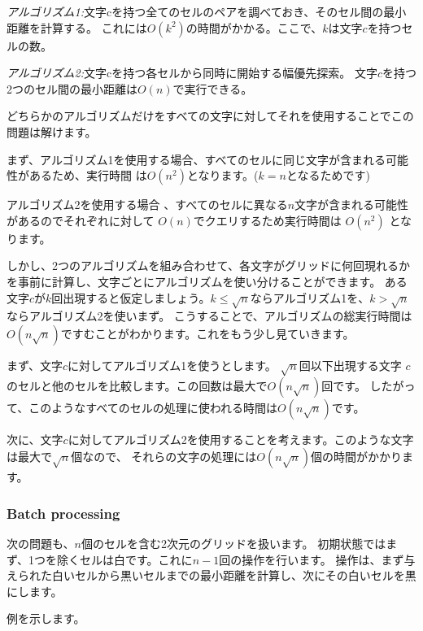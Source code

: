 \emph{アルゴリズム1:}文字cを持つ全てのセルのペアを調べておき、そのセル間の最小距離を計算する。
これには$O(k^2)$の時間がかかる。ここで、$k$は文字$c$を持つセルの数。

\emph{アルゴリズム2:}文字cを持つ各セルから同時に開始する幅優先探索。
文字$c$を持つ2つのセル間の最小距離は$O(n)$で実行できる。

どちらかのアルゴリズムだけをすべての文字に対してそれを使用することでこの問題は解けます。

まず、アルゴリズム1を使用する場合、すべてのセルに同じ文字が含まれる可能性があるため、実行時間
は$O(n^2)$となります。($k=n$となるためです)

アルゴリズム2を使用する場合 、すべてのセルに異なる$n$文字が含まれる可能性があるのでそれぞれに対して
$O(n)$でクエリするため実行時間は $O(n^2)$ となります。

しかし、2つのアルゴリズムを組み合わせて、各文字がグリッドに何回現れるかを事前に計算し、文字ごとにアルゴリズムを使い分けることができます。
ある文字$c$が$k$回出現すると仮定しましょう。$k \le \sqrt n$ならアルゴリズム1を、$k > \sqrt n$ならアルゴリズム2を使いまず。
こうすることで、アルゴリズムの総実行時間は$O(n \sqrt n)$ですむことがわかります。これをもう少し見ていきます。

まず、文字$c$に対してアルゴリズム1を使うとします。
$\sqrt n$回以下出現する文字 $c$のセルと他のセルを比較します。この回数は最大で$O(n \sqrt n)$回です。
したがって、このようなすべてのセルの処理に使われる時間は$O(n \sqrt n)$です。

次に、文字$c$に対してアルゴリズム2を使用することを考えます。このような文字は最大で$\sqrt n$個なので、
それらの文字の処理には$O(n \sqrt n)$個の時間がかかります。

\subsubsection{Batch processing}


次の問題も、$n$個のセルを含む2次元のグリッドを扱います。
初期状態ではまず、1つを除くセルは白です。これに$n - 1$回の操作を行います。
操作は、まず与えられた白いセルから黒いセルまでの最小距離を計算し、次にその白いセルを黒にします。

例を示します。

\begin{center}
\end{center}

